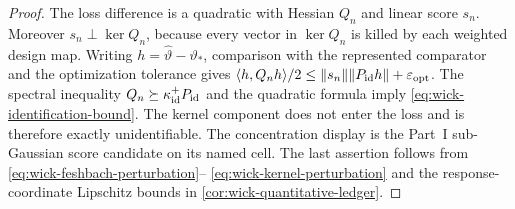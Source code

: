 \documentclass[11pt]{article}
\numberwithin{section}{part}
\theoremstyle{plain}
\theoremstyle{definition}
\theoremstyle{remark}
\begin{document}
\begin{proof}
The loss difference is a quadratic with Hessian \(Q_n\) and linear score
\(s_n\).  Moreover \(s_n\perp\ker Q_n\), because every vector in
\(\ker Q_n\) is killed by each weighted design map.  Writing
\(h=\widehat\vartheta-\vartheta_*\), comparison with the represented
comparator and the optimization tolerance gives
\(\langle h,Q_nh\rangle/2
 \le \|s_n\|\|P_{\rm id}h\|+\varepsilon_{\rm opt}\).
The spectral inequality
\(Q_n\succeq\kappa_{\rm id}^+P_{\rm id}\) and the quadratic formula imply
\eqref{eq:wick-identification-bound}.  The kernel component does not enter
the loss and is therefore exactly unidentifiable.  The concentration display
is the Part~I sub-Gaussian score candidate on its named cell.  The last
assertion follows
from \eqref{eq:wick-feshbach-perturbation}--
\eqref{eq:wick-kernel-perturbation} and the response-coordinate Lipschitz
bounds in \cref{cor:wick-quantitative-ledger}.
\end{proof}
\end{document}
